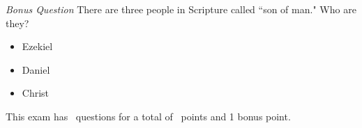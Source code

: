 \documentclass[11pt,addpoints]{exam}   	%
\begin{document}
\begin{questions}
\vspace{0.2in}
 
\bonusquestion \emph{Bonus Question} 
There are three people in Scripture called ``son of man." Who are they?
\begin{solution}
\begin{itemize}
\item Ezekiel
\item Daniel
\item Christ
\end{itemize}
\end{solution}

\end{questions}

\begin{center}
This exam has \numquestions\ questions for a total of \numpoints\ points and 1 bonus point.
\end{center}

\pagebreak
\end{document}
